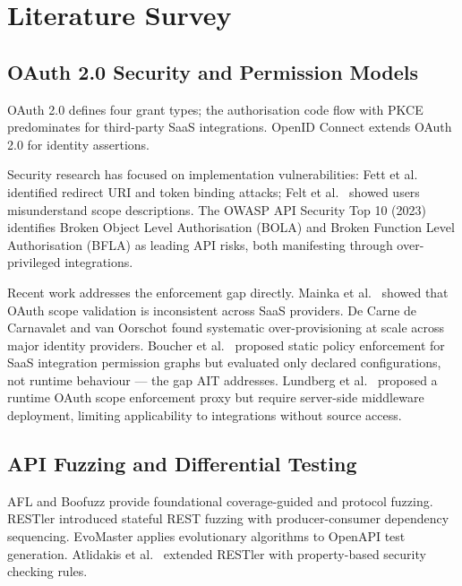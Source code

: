 \documentclass[12pt,a4paper]{report}
\begin{document}
\chapter{Literature Survey}

\section{OAuth 2.0 Security and Permission Models}

OAuth 2.0 \cite{rfc6749} defines four grant types; the authorisation code flow with PKCE
\cite{rfc7636} predominates for third-party SaaS integrations. OpenID Connect \cite{oidc2014}
extends OAuth 2.0 for identity assertions.

Security research has focused on implementation vulnerabilities: Fett et al.\ \cite{fett2017}
identified redirect URI and token binding attacks; Felt et al.\ \cite{felt2012} showed users
misunderstand scope descriptions. The OWASP API Security Top 10 (2023) \cite{owaspapi2023}
identifies Broken Object Level Authorisation (BOLA) and Broken Function Level Authorisation
(BFLA) as leading API risks, both manifesting through over-privileged integrations.

Recent work addresses the enforcement gap directly. Mainka et al.\ \cite{mainka2022} showed
that OAuth scope validation is inconsistent across SaaS providers. De Carne de Carnavalet and
van Oorschot \cite{decarne2023} found systematic over-provisioning at scale across major
identity providers. Boucher et al.\ \cite{boucher2024} proposed static policy enforcement for
SaaS integration permission graphs but evaluated only declared configurations, not runtime
behaviour --- the gap AIT addresses. Lundberg et al.\ \cite{lundberg2024} proposed a runtime
OAuth scope enforcement proxy but require server-side middleware deployment, limiting
applicability to integrations without source access.

\section{API Fuzzing and Differential Testing}

AFL \cite{afl} and Boofuzz \cite{boofuzz} provide foundational coverage-guided and protocol
fuzzing. RESTler \cite{restler2019} introduced stateful REST fuzzing with producer-consumer
dependency sequencing. EvoMaster \cite{evomaster2019} applies evolutionary algorithms to
OpenAPI test generation. Atlidakis et al.\ \cite{atlidakis2020} extended RESTler with
property-based security checking rules.
\end{document}
